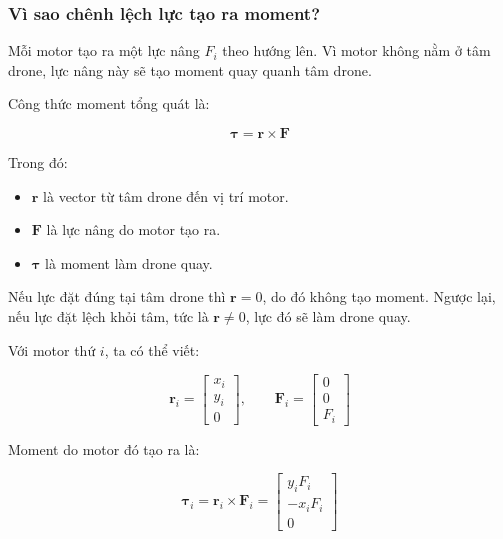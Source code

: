\subsubsection{Vì sao chênh lệch lực tạo ra moment?}

Mỗi motor tạo ra một lực nâng $F_i$ theo hướng lên. Vì motor không nằm ở tâm
drone, lực nâng này sẽ tạo moment quay quanh tâm drone.

Công thức moment tổng quát là:

\begin{equation}
    \boldsymbol{\tau}
    =
    \mathbf{r}
    \times
    \mathbf{F}
\end{equation}

Trong đó:
\begin{itemize}
    \item $\mathbf{r}$ là vector từ tâm drone đến vị trí motor.
    \item $\mathbf{F}$ là lực nâng do motor tạo ra.
    \item $\boldsymbol{\tau}$ là moment làm drone quay.
\end{itemize}

Nếu lực đặt đúng tại tâm drone thì $\mathbf{r}=0$, do đó không tạo moment.
Ngược lại, nếu lực đặt lệch khỏi tâm, tức là $\mathbf{r}\neq 0$, lực đó sẽ làm
drone quay.

Với motor thứ $i$, ta có thể viết:

\begin{equation}
    \mathbf{r}_i
    =
    \begin{bmatrix}
        x_i\\
        y_i\\
        0
    \end{bmatrix},
    \qquad
    \mathbf{F}_i
    =
    \begin{bmatrix}
        0\\
        0\\
        F_i
    \end{bmatrix}
\end{equation}

Moment do motor đó tạo ra là:

\begin{equation}
    \boldsymbol{\tau}_i
    =
    \mathbf{r}_i
    \times
    \mathbf{F}_i
    =
    \begin{bmatrix}
        y_iF_i\\
        -x_iF_i\\
        0
    \end{bmatrix}
\end{equation}


